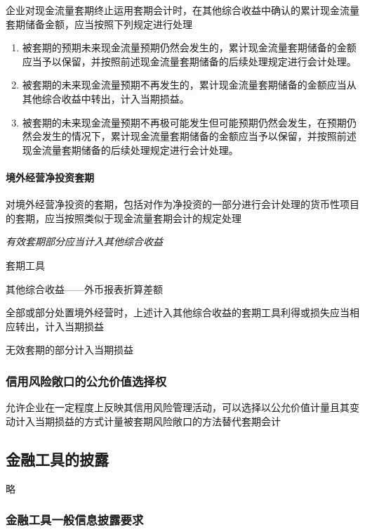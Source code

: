 \documentclass[UTF8,12pt]{ctexart}
\newenvironment{Dr}{%
	\begin{list}{}%
		{
			\setlength{\leftmargin}{2em}
			\setlength{\labelwidth}{2em}
			\setlength{\labelsep}{0pt}
			\setlength{\itemindent}{0pt}
			\setlength{\listparindent}{0pt}
			\setlength{\parsep}{0pt}
			\setlength{\topsep}{0pt}
		}
		\item[\textbf{借：}]
	}{%
	\end{list}
}
\newenvironment{Cr}{%
	\begin{list}{}%
		{
			\setlength{\leftmargin}{3em}
			\setlength{\labelwidth}{2em}
			\setlength{\labelsep}{0pt}
			\setlength{\itemindent}{0pt}
			\setlength{\listparindent}{0pt}
			\setlength{\parsep}{0pt}
			\setlength{\topsep}{0pt}
		}
		\item[\textbf{贷：}]
	}{%
	\end{list}
}
\numberwithin{equation}{section} %
\numberwithin{figure}{section}
\numberwithin{table}{section}
\begin{document}
	企业对现金流量套期终止运用套期会计时，在其他综合收益中确认的累计现金流量套期储备金额，应当按照下列规定进行处理
	\begin{enumerate}
		\item 被套期的预期未来现金流量预期仍然会发生的，累计现金流量套期储备的金额应当予以保留，并按照前述现金流量套期储备的后续处理规定进行会计处理。
		
		\item 被套期的未来现金流量预期不再发生的，累计现金流量套期储备的金额应当从其他综合收益中转出，计入当期损益。
		
		\item 被套期的未来现金流量预期不再极可能发生但可能预期仍然会发生，在预期仍然会发生的情况下，累计现金流量套期储备的金额应当予以保留，并按照前述现金流量套期储备的后续处理规定进行会计处理。
	\end{enumerate}
	
	\paragraph{境外经营净投资套期}
	对境外经营净投资的套期，包括对作为净投资的一部分进行会计处理的货币性项目的套期，应当按照类似于现金流量套期会计的规定处理
	
	\textit{有效套期部分应当计入其他综合收益}
	
	\begin{Dr}
		套期工具
	\end{Dr}
	\begin{Cr}
		其他综合收益——外币报表折算差额
	\end{Cr}
	
	全部或部分处置境外经营时，上述计入其他综合收益的套期工具利得或损失应当相应转出，计入当期损益
	
	无效套期的部分计入当期损益
	
	
	\subsubsection{信用风险敞口的公允价值选择权}
	允许企业在一定程度上反映其信用风险管理活动，可以选择以公允价值计量且其变动计入当期损益的方式计量被套期风险敞口的方法替代套期会计
	
	\subsection{金融工具的披露}
	略
	\subsubsection{金融工具一般信息披露要求}
\end{document}
